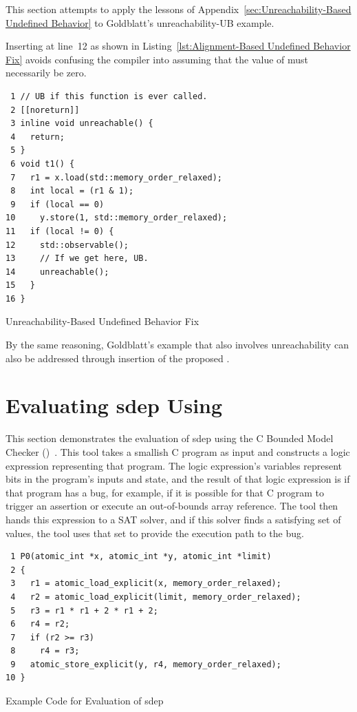\documentclass[10]{article}
\begin{document}
This section attempts to apply the lessons
of Appendix~\ref{sec:Unreachability-Based Undefined Behavior} to
Goldblatt's unreachability-UB example.

Inserting  at line~12
as shown in Listing~\ref{lst:Alignment-Based Undefined Behavior Fix}
avoids confusing the compiler into assuming that the value of 
must necessarily be zero.

\begin{listing}[tbp]
\begin{verbatim}
 1 // UB if this function is ever called.
 2 [[noreturn]]
 3 inline void unreachable() {
 4   return;
 5 }
 6 void t1() {
 7   r1 = x.load(std::memory_order_relaxed);
 8   int local = (r1 & 1);
 9   if (local == 0)
10     y.store(1, std::memory_order_relaxed);
11   if (local != 0) {
12     std::observable();
13     // If we get here, UB.
14     unreachable();
15   }
16 }
\end{verbatim}
\caption{Unreachability-Based Undefined Behavior Fix}
\label{lst:Unreachability-Based Undefined Behavior Fix}
\end{listing}

By the same reasoning, Goldblatt's  example that
also involves unreachability can also be addressed through insertion
of the proposed .

\clearpage

\section{Evaluating sdep Using }
\label{sec:Evaluating sdep Using cbmc}

This section demonstrates the evaluation of sdep using
the C Bounded Model Checker
()~\cite{EdmundClarke2004CBMC}.
This tool takes a smallish C program as input and constructs a logic
expression representing that program.
The logic expression's variables represent bits in the program's inputs
and state, and the result of that logic expression is  if that
program has a bug, for example, if it is possible for that C program to
trigger an assertion or execute an out-of-bounds array reference.
The tool then hands this expression to a SAT solver, and if this solver
finds a satisfying set of values, the tool uses that set to provide
the execution path to the bug.

\begin{listing}[tbp]
\scriptsize
\begin{verbatim}
 1 P0(atomic_int *x, atomic_int *y, atomic_int *limit)
 2 {
 3   r1 = atomic_load_explicit(x, memory_order_relaxed);
 4   r2 = atomic_load_explicit(limit, memory_order_relaxed);
 5   r3 = r1 * r1 + 2 * r1 + 2;
 6   r4 = r2;
 7   if (r2 >= r3)
 8     r4 = r3;
 9   atomic_store_explicit(y, r4, memory_order_relaxed);
10 }
\end{verbatim}
\caption{Example Code for Evaluation of sdep}
\label{lst:Example Code for Evaluation of sdep}
\end{listing}
\end{document}
